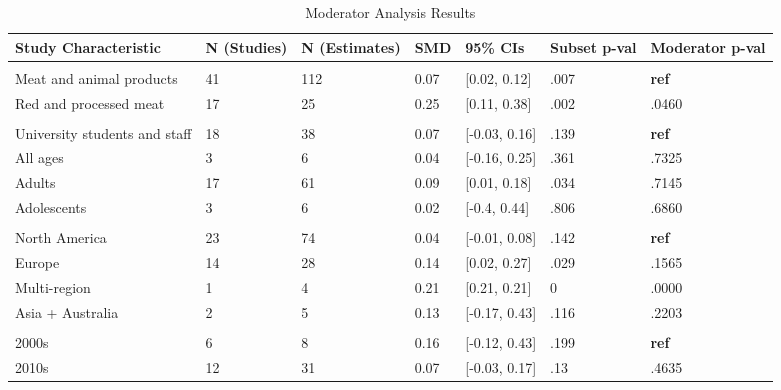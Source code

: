 \documentclass[sn-nature,referee,pdflatex]{sn-jnl}
\begin{document}
\begin{table}[!h]
\centering
\caption{\label{tab:table_two}Moderator Analysis Results}
\centering
\begin{tabular}[t]{lllllll}
\toprule
Study Characteristic & N (Studies) & N (Estimates) & SMD & 95\% CIs & Subset p-val & Moderator p-val\\
\midrule
\addlinespace[0.3em]
\multicolumn{7}{l}{\textbf{Outcome}}\\
\hspace{1em}Meat and animal products & 41 & 112 & 0.07 & {}[0.02, 0.12] & .007 & \textbf{ref}\\
\hspace{1em}Red and processed meat & 17 & 25 & 0.25 & {}[0.11, 0.38] & .002 & .0460\\
\addlinespace[0.3em]
\multicolumn{7}{l}{\textbf{Population}}\\
\hspace{1em}University students and staff & 18 & 38 & 0.07 & {}[-0.03, 0.16] & .139 & \textbf{ref}\\
\hspace{1em}All ages & 3 & 6 & 0.04 & {}[-0.16, 0.25] & .361 & .7325\\
\hspace{1em}Adults & 17 & 61 & 0.09 & {}[0.01, 0.18] & .034 & .7145\\
\hspace{1em}Adolescents & 3 & 6 & 0.02 & {}[-0.4, 0.44] & .806 & .6860\\
\addlinespace[0.3em]
\multicolumn{7}{l}{\textbf{Region}}\\
\hspace{1em}North America & 23 & 74 & 0.04 & {}[-0.01, 0.08] & .142 & \textbf{ref}\\
\hspace{1em}Europe & 14 & 28 & 0.14 & {}[0.02, 0.27] & .029 & .1565\\
\hspace{1em}Multi-region & 1 & 4 & 0.21 & {}[0.21, 0.21] & 0 & .0000\\
\hspace{1em}Asia + Australia & 2 & 5 & 0.13 & {}[-0.17, 0.43] & .116 & .2203\\
\addlinespace[0.3em]
\multicolumn{7}{l}{\textbf{Publication Decade}}\\
\hspace{1em}2000s & 6 & 8 & 0.16 & {}[-0.12, 0.43] & .199 & \textbf{ref}\\
\hspace{1em}2010s & 12 & 31 & 0.07 & {}[-0.03, 0.17] & .13 & .4635\\

\end{tabular}
\end{table}
\end{document}

